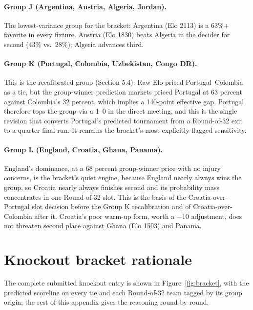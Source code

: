 \documentclass[11pt,letterpaper]{article}
\begin{document}


\paragraph{Group J (Argentina, Austria, Algeria, Jordan).} The lowest-variance group for the bracket: Argentina (Elo 2113) is a 63\%+ favorite in every fixture. Austria (Elo 1830) beats Algeria in the decider for second (43\% vs.\ 28\%); Algeria advances third.




\paragraph{Group K (Portugal, Colombia, Uzbekistan, Congo DR).} This is the recalibrated group (Section 5.4). Raw Elo priced Portugal--Colombia as a tie, but the group-winner prediction markets priced Portugal at 63 percent against Colombia's 32 percent, which implies a 140-point effective gap. Portugal therefore tops the group via a 1--0 in the direct meeting, and this is the single revision that converts Portugal's predicted tournament from a Round-of-32 exit to a quarter-final run. It remains the bracket's most explicitly flagged sensitivity.




\paragraph{Group L (England, Croatia, Ghana, Panama).} England's dominance, at a 68 percent group-winner price with no injury concerns, is the bracket's quiet engine, because England nearly always wins the group, so Croatia nearly always finishes second and its probability mass concentrates in one Round-of-32 slot. This is the basis of the Croatia-over-Portugal slot decision before the Group K recalibration and of Croatia-over-Colombia after it. Croatia's poor warm-up form, worth a $-10$ adjustment, does not threaten second place against Ghana (Elo 1503) and Panama.




\section{Knockout bracket rationale}\label{app:bracket}

The complete submitted knockout entry is shown in Figure~\ref{fig:bracket}, with the predicted scoreline on every tie and each Round-of-32 team tagged by its group origin; the rest of this appendix gives the reasoning round by round.
\end{document}
